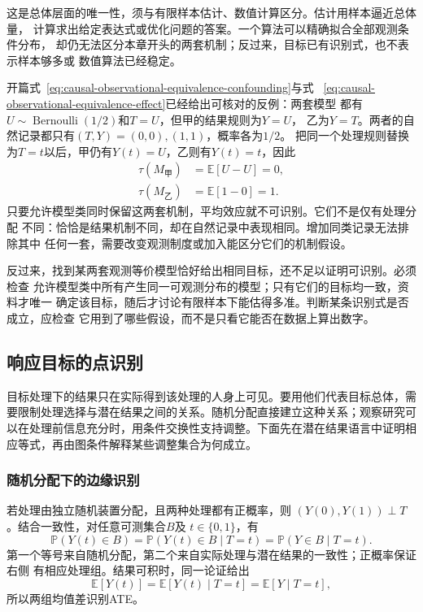 这是总体层面的唯一性，须与有限样本估计、数值计算区分。估计用样本逼近总体量，
计算求出给定表达式或优化问题的答案。一个算法可以精确拟合全部观测条件分布，
却仍无法区分本章开头的两套机制；反过来，目标已有识别式，也不表示样本够多或
数值算法已经稳定。

开篇式~\eqref{eq:causal-observational-equivalence-confounding}与式
~\eqref{eq:causal-observational-equivalence-effect}已经给出可核对的反例：两套模型
都有\(U\sim\operatorname{Bernoulli}(1/2)\)和\(T=U\)，但甲的结果规则为\(Y=U\)，
乙为\(Y=T\)。两者的自然记录都只有\((T,Y)=(0,0),(1,1)\)，概率各为\(1/2\)。
把同一个处理规则替换为\(T=t\)以后，甲仍有\(Y(t)=U\)，乙则有\(Y(t)=t\)，因此
\[
  \begin{aligned}
    \tau(M_{\text{甲}})&=\mathbb E[U-U]=0,\\
    \tau(M_{\text{乙}})&=\mathbb E[1-0]=1.
  \end{aligned}
\]
只要允许模型类同时保留这两套机制，平均效应就不可识别。它们不是仅有处理分配
不同：恰恰是结果机制不同，却在自然记录中表现相同。增加同类记录无法排除其中
任何一套，需要改变观测制度或加入能区分它们的机制假设。

反过来，找到某两套观测等价模型恰好给出相同目标，还不足以证明可识别。必须检查
允许模型类中所有产生同一可观测分布的模型；只有它们的目标均一致，资料才唯一
确定该目标，随后才讨论有限样本下能估得多准。判断某条识别式是否成立，应检查
它用到了哪些假设，而不是只看它能否在数据上算出数字。

\subsection{响应目标的点识别}
\label{sec:causal-point-identification}

目标处理下的结果只在实际得到该处理的人身上可见。要用他们代表目标总体，需要限制处理选择与潜在结果之间的关系。随机分配直接建立这种关系；观察研究可以在处理前信息充分时，用条件交换性支持调整。下面先在潜在结果语言中证明相应等式，再由图条件解释某些调整集合为何成立。

\subsubsection{随机分配下的边缘识别}
\label{sec:causal-randomized-identification}

若处理由独立随机装置分配，且两种处理都有正概率，则
\((Y(0),Y(1))\perp T\)。结合一致性，对任意可测集合\(B\)及
\(t\in\{0,1\}\)，有
\begin{equation}
  \mathbb P(Y(t)\in B)
  =
  \mathbb P(Y(t)\in B\mid T=t)
  =
  \mathbb P(Y\in B\mid T=t).
  \label{eq:causal-randomization-marginal-distribution}
\end{equation}
第一个等号来自随机分配，第二个来自实际处理与潜在结果的一致性；正概率保证右侧
有相应处理组。结果可积时，同一论证给出
\[
  \mathbb E[Y(t)]
  =\mathbb E[Y(t)\mid T=t]
  =\mathbb E[Y\mid T=t],
\]
所以两组均值差识别ATE。


